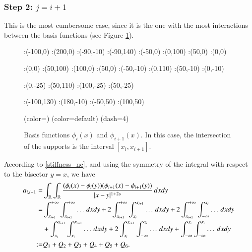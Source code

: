 \subsubsection*{Step 2: $j= i+1$}
This is the most cumbersome case, since it is the one with the most interactions between the basis functions (see Figure \ref{basis_upp_dia}). 

\begin{figure}[h]
\figinit{0.8pt}
:(-100,0) :(200,0)
:(-90,-10) :(-90,140)
:(-50,0) :(0,100) 
:(50,0) :(0,0)

:(0,0) :(50,100) 
:(100,0) :(50,0)
%
:(-50,-10) :(0,110) 
:(50,-10) :(0,-10)

:(0,-25) :(50,110) 
:(100,-25) :(50,-25)

:(-100,130) :(180,-10)
:(-50,50) :(100,50)

\figdrawbegin{}
\figdrawarrow[1,2]
\figdrawline[3,4]
\figdrawline[4,5]
\figset (color=\Redrgb)
\figdrawline[31,41]
\figdrawline[41,51]
\figset (color=default)
\figset(dash=4)
\figdrawline[4,6]
\figdrawline[41,61]
\figdrawarrow[11,12]

\figdrawend

\centerline{\box\figBoxA}
\caption{Basis functions $\phi_i(x)$ and $\phi_{i+1}(x)$. In this case, the intersection of the supports is the interval $[x_i,x_{i+1}]$.}\label{basis_upp_dia}
\end{figure}

According to \eqref{stiffness_nc}, and using the symmetry of the integral with respect to the bisector $y=x$, we have 
	\begin{align*}
	a_{i,i+1}= & \int_{\mathbb{R}}\int_{\mathbb{R}}\frac{(\phi_i(x)-\phi_i(y))(\phi_{i+1}(x)-\phi_{i+1}(y))}{|x-y|^{1+2s}}\,dxdy
	\\
	= & \int_{x_{i+1}}^{+\infty}\int_{x_{i+1}}^{+\infty} \ldots\,dxdy + 2\int_{x_{i+1}}^{+\infty}\int_{x_i}^{x_{i+1}} \ldots\,dxdy + 2\int_{x_{i+1}}^{+\infty}\int_{-\infty}^{x_i} \ldots\,dxdy 
	\\
	& + \int_{x_i}^{x_{i+1}}\int_{x_i}^{x_{i+1}} \ldots\,dxdy + 2\int_{x_i}^{x_{i+1}}\int_{-\infty}^{x_i} \ldots\,dxdy + \int_{-\infty}^{x_i}\int_{-\infty}^{x_i} \ldots\,dxdy 
	\\
	:= & Q_1 + Q_2 + Q_3 + Q_4 + Q_5 + Q_6.
\end{align*}


